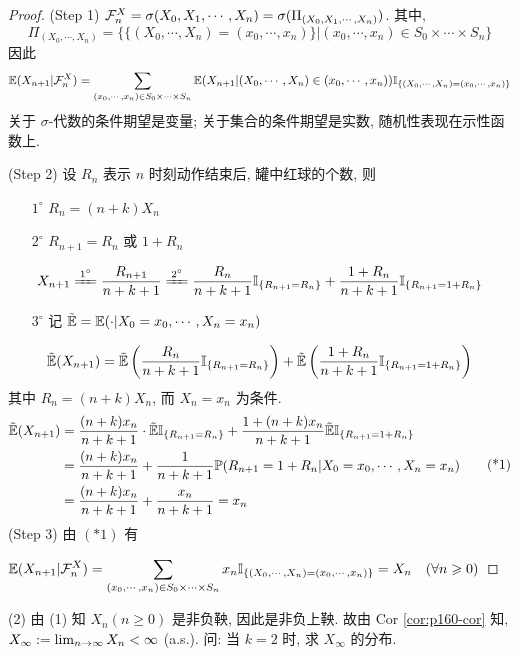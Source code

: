 \begin{proof}
(Step 1) $\mathcal{F}_n^X=\sigma(X_0,X_1,\cdots,X_n)=\sigma(\Pi_{(X_0,X_1,\cdots,X_n)})$. 其中,
\[
\Pi_{(X_0,\cdots,X_n)}=\biggl\{
\{(X_0,\cdots,X_n)=(x_0,\cdots,x_n)\}\bigg| (x_0,\cdots,x_n)\in S_0\times\cdots\times S_n    
\biggr\}
\]
因此
\[
\mathbb E(X_{n+1}|\mathcal{F}_n^X)=\sum_{(x_0,\cdots,x_n)\\\in S_0\times \cdots\times S_n}\mathbb E(X_{n+1}|(X_0,\cdots,X_n)\in (x_0,\cdots,x_n))\mathbb I_{\{(X_0,\cdots,X_n)=(x_0,\cdots,x_n)\}}
\]
关于 $\sigma$-代数的条件期望是变量; 关于集合的条件期望是实数, 随机性表现在示性函数上.

(Step 2) 设 $R_n$ 表示 $n$ 时刻动作结束后, 罐中红球的个数, 则
\begin{itemize}
    \item[$1^\circ$] $R_n=(n+k)X_n$
    \item[$2^\circ$] $R_{n+1}=R_n$ 或 $1+R_n$
\end{itemize}
\[
X_{n+1}\xlongequal{1^\circ}\frac{R_{n+1}}{n+k+1}\xlongequal{2^\circ}\frac{R_n}{n+k+1}\II_{\{R_{n+1}=R_n\}}+\frac{1+R_n}{n+k+1}\II_{\{R_{n+1}=1+R_n\}}
\]
\begin{itemize}
    \item[$3^\circ$] 记 $\tilde{\mathbb E}=\mathbb E(\cdot|X_0=x_0,\cdots,X_n=x_n)$
\end{itemize}
\[
\tilde{\mathbb E}(X_{n+1})=\tilde{\mathbb E}\left(
    \frac{R_n}{n+k+1}\mathbb I_{\{R_{n+1}=R_n\}}
\right)+\tilde{\mathbb E}\left(
    \frac{1+R_n}{n+k+1}\mathbb I_{\{R_{n+1}=1+R_n\}}
\right)
\]
其中 $R_n=(n+k)X_n$, 而 $X_n=x_n$ 为条件.
\[
\begin{aligned}
    \tilde{\mathbb E}(X_{n+1}) &= \frac{(n+k)x_n}{n+k+1}\cdot \tilde{\mathbb E}\mathbb I_{\{R_{n+1}=R_n\}}+
    \frac{1+(n+k)x_n}{n+k+1}\tilde{\mathbb E}\mathbb I_{\{R_{n+1}=1+R_n\}}\\
    &=\frac{(n+k)x_n}{n+k+1} +\frac{1}{n+k+1}\mathbb{P}(R_{n+1}=1+R_n|X_0=x_0,\cdots,X_n=x_n)\\
    &=\frac{(n+k)x_n}{n+k+1}+\frac{x_n}{n+k+1}=x_n
\end{aligned}
\tag{*1}
\]
(Step 3) 由 $(*1)$ 有

$\displaystyle\mathbb E(X_{n+1}|\mathcal{F}_n^X)=\sum_{(x_0,\cdots,x_n)\\\in S_0\times \cdots\times S_n}
x_n\mathbb I_{\{(X_0,\cdots,X_n)=(x_0,\cdots,x_n)\}}=X_n\quad (\forall n\geqslant 0)$
\end{proof}

(2) 由 (1) 知 $X_n(n\geq 0)$ 是非负鞅, 因此是非负上鞅. 故由 Cor \ref{cor:p160-cor} 知, $X_{\infty}:=\lim_{n \to \infty}X_n<\infty$ (a.s.). 问: 当 $k=2$ 时, 求 $X_{\infty}$ 的分布.

